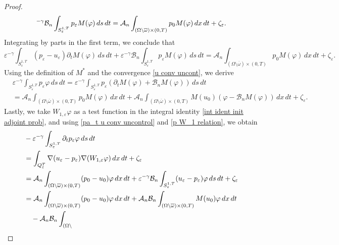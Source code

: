 \documentclass[reqno]{amsart}
\begin{document}
\begin{proof}
\[^{-\gamma }\mathcal{B}_n\int _{S_{\varepsilon }^{1,T}}p_{\varepsilon }M(\varphi ){%
\,ds\,dt}=\mathcal{A}_n\int _{(\Omega \setminus \overline{\omega }%
)\times (0,T)}p_0M(\varphi )\,dx\,dt+\zeta _{\varepsilon }.
\]
Integrating by parts in the first term, we conclude that
\[
\varepsilon ^{-\gamma }\int _{S_{\varepsilon }^{1,T}}(p_{\varepsilon
}-u_{\varepsilon })\partial _{t}M(\varphi )\,ds\,dt+\varepsilon ^{-\gamma
}\mathcal{B}_n \int _{S_{\varepsilon }^{1,T}}p_{\varepsilon }M(\varphi )\,ds\,dt=%
\mathcal{A}_n\int _{(\Omega \setminus \overline{\omega })\times
(0,T)}p_0M(\varphi )\,dx\,dt+\zeta _{\varepsilon }.
\]
Using the definition of $M^{\ast }$ and the convergence
\eqref{u conv uncont}, we derive
\begin{equation}
\begin{aligned}
&\varepsilon ^{-\gamma }\int _{S_{\varepsilon }^{1,T}}p_{\varepsilon
}\varphi \,ds\,dt=\varepsilon ^{-\gamma }\int _{S_{\varepsilon
}^{1,T}}p_{\varepsilon }(\partial _{t}M(\varphi )+\mathcal{B}_nM(\varphi ))%
\,ds\,dt    \\
&=\mathcal{A}_n\int _{(\Omega \setminus \overline{\omega })\times
(0,T)}p_0M(\varphi )\,dx\,dt+\mathcal{A}_n\int _{(\Omega \setminus
\overline{\omega })\times (0,T)}M(u_0)(\varphi -\mathcal{B}_nM(\varphi ))
\,dx\,dt+\zeta _{\varepsilon }.
\end{aligned}  \label{p W_1 relation}
\end{equation}
Lastly, we take $W_{1,\varepsilon }\varphi $ as a test function in the
integral identity \eqref{int ident init adjoint prob}, and using
\eqref{pa_t u conv uncontrol} and \eqref{p W_1 relation}, we obtain
\begin{align*}
&-\varepsilon ^{-\gamma }\int _{S_{\varepsilon }^{1,T}}\partial
_{t}p_{\varepsilon }\varphi \,ds\,dt \\
&=\int _{Q_{\varepsilon }^{T}}\nabla
(u_{\varepsilon }-p_{\varepsilon })\nabla (W_{1,\varepsilon }\varphi )\,dx\,dt%
+\zeta _{\varepsilon } \\
&=\mathcal{A}_n\int _{(\Omega \setminus \overline{\omega })\times
(0,T)}(p_0-u_0)\varphi \,dx\,dt+\varepsilon ^{-\gamma }\mathcal{B}_n\int
_{S_{\varepsilon }^{1,T}}(u_{\varepsilon }-p_{\varepsilon })\varphi {%
\,ds\,dt}+\zeta _{\varepsilon } \\
&=\mathcal{A}_n\int _{(\Omega \setminus \overline{\omega })\times
(0,T)}(p_0-u_0)\varphi \,dx\,dt+\mathcal{A}_n\mathcal{B}_n\int
_{(\Omega \setminus \overline{\omega })\times (0,T)}M(u_0)\varphi {%
\,dx\,dt} \\
&\quad -\mathcal{A}_n\mathcal{B}_n\int _{(\Omega \setminus \overline{%
}}
\end{align*}
\end{proof}
\end{document}
